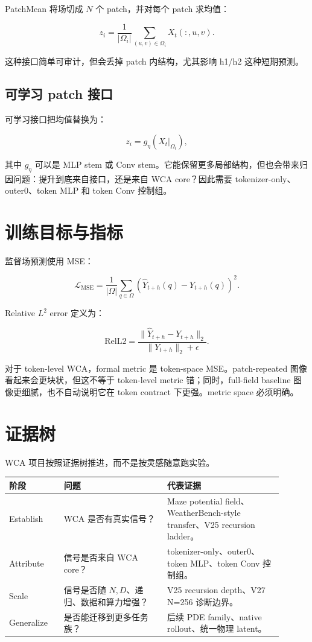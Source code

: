 \documentclass[11pt]{article}
\begin{document}
PatchMean 将场切成 $N$ 个 patch，并对每个 patch 求均值：

\[
z_i
=
\frac{1}{|\Omega_i|}
\sum_{(u,v)\in \Omega_i}
X_t(:,u,v).
\]

这种接口简单可审计，但会丢掉 patch 内结构，尤其影响 h1/h2 这种短期预测。

\subsection{可学习 patch 接口}

可学习接口把均值替换为：

\[
z_i = g_\eta(X_t|_{\Omega_i}),
\]

其中 $g_\eta$ 可以是 MLP stem 或 Conv stem。它能保留更多局部结构，但也会带来归因问题：提升到底来自接口，还是来自 WCA core？因此需要 tokenizer-only、outer0、token MLP 和 token Conv 控制组。

\section{训练目标与指标}

监督场预测使用 MSE：

\[
\mathcal{L}_{\mathrm{MSE}}
=
\frac{1}{|\Omega|}
\sum_{q\in \Omega}
\left(
\hat{Y}_{t+h}(q)-Y_{t+h}(q)
\right)^2.
\]

Relative $L^2$ error 定义为：

\[
\mathrm{RelL2}
=
\frac{\|\hat{Y}_{t+h}-Y_{t+h}\|_2}
{\|Y_{t+h}\|_2+\epsilon}.
\]

对于 token-level WCA，formal metric 是 token-space MSE。patch-repeated 图像看起来会更块状，但这不等于 token-level metric 错；同时，full-field baseline 图像更细腻，也不自动说明它在 token contract 下更强。metric space 必须明确。

\section{证据树}

WCA 项目按照证据树推进，而不是按灵感随意跑实验。

\begin{longtable}{p{0.18\linewidth}p{0.34\linewidth}p{0.38\linewidth}}
\toprule
阶段 & 问题 & 代表证据 \\
\midrule
Establish & WCA 是否有真实信号？ & Maze potential field、WeatherBench-style transfer、V25 recursion ladder。 \\
Attribute & 信号是否来自 WCA core？ & tokenizer-only、outer0、token MLP、token Conv 控制组。 \\
Scale & 信号是否随 $N,D$、递归、数据和算力增强？ & V25 recursion depth、V27 N=256 诊断边界。 \\
Generalize & 是否能迁移到更多任务族？ & 后续 PDE family、native rollout、统一物理 latent。 \\
\bottomrule
\end{longtable}
\end{document}
